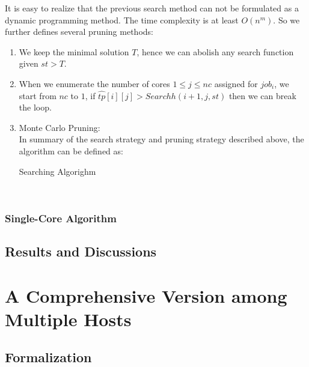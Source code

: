 \documentclass{llncs}
\begin{document}
  It is easy to realize that the previous search method can not be formulated as a dynamic programming method. The time complexity is at least $O(n^m)$. So we further defines several pruning methods:
  \begin{enumerate}
    \item We keep the minimal solution $T$, hence we can abolish any search function given $st > T$.
    \item When we enumerate the number of cores $1\leq j \leq nc$ assigned for $job_i$, we start from $nc$ to $1$, if $\hat{tp}[i][j] > Searchh(i+1,j,st)$ then we can break the loop.
    \item Monte Carlo Pruning:\\

   In summary of the search strategy and pruning strategy described above, the algorithm can be defined as:

   \begin{minipage}[t]{0.9\textwidth}
     \begin{algorithm}[H]
       \BlankLine
       \caption{Searching Algorighm}\label{Alg_2}
       \BlankLine
     \end{algorithm}
   \end{minipage}\\

  \end{enumerate}
\subsubsection{Single-Core Algorithm}

\subsection{Results and Discussions}\label{subsec-result1}

\section{A Comprehensive Version among Multiple Hosts}
\label{sec-problem2}

\subsection{Formalization}\label{subsec-form2}
\end{document}
